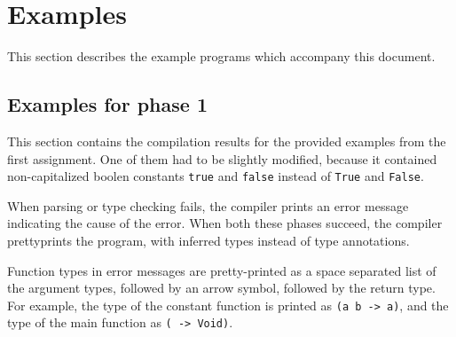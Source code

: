 \documentclass[a4paper]{article}
\begin{document}
\section{Examples}

This section describes the example programs which accompany this document.

\subsection{Examples for phase 1}

This section contains the compilation results for the provided examples from the
first assignment.  One of them had to be slightly modified, because it contained
non-capitalized boolen constants \texttt{true} and \texttt{false} instead of
\texttt{True} and \texttt{False}.

When parsing or type checking fails, the compiler prints an error message
indicating the cause of the error.  When both these phases succeed, the compiler
prettyprints the program, with inferred types instead of type annotations.

Function types in error messages are pretty-printed as a space separated list
of the argument types, followed by an arrow symbol, followed by the return
type.  For example, the type of the constant function is printed as \texttt{(a
b -> a)}, and the type of the main function as \texttt{( -> Void)}.
\end{document}
